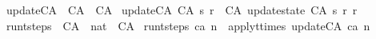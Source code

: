 \begin{isabellebody}
\isanewline
{}\isamarkupfalse%
\ update{\isacharunderscore}CA\ {\isacharcolon}{\isacharcolon}\ {\isachardoublequoteopen}CA\ {\isasymRightarrow}\ CA{\isachardoublequoteclose}\ \isanewline
{\isachardoublequoteopen}update{\isacharunderscore}CA\ {\isacharparenleft}CA\ s\ r{\isacharparenright}\ {\isacharequal}\ CA\ {\isacharparenleft}update{\isacharunderscore}state\ {\isacharparenleft}CA\ s\ r{\isacharparenright}{\isacharparenright}\ r{\isachardoublequoteclose}\isanewline
\isanewline
{}\isamarkupfalse%
\ run{\isacharunderscore}t{\isacharunderscore}steps\ {\isacharcolon}{\isacharcolon}\ {\isachardoublequoteopen}CA\ {\isasymRightarrow}\ nat\ {\isasymRightarrow}\ CA{\isachardoublequoteclose}\ \isanewline
{\isachardoublequoteopen}run{\isacharunderscore}t{\isacharunderscore}steps\ ca\ n\ {\isacharequal}\ apply{\isacharunderscore}t{\isacharunderscore}times\ update{\isacharunderscore}CA\ ca\ n{\isachardoublequoteclose}\isanewline
%
\isadelimtheory
%
\endisadelimtheory
%
\isatagtheory
{}\isamarkupfalse%
%
\endisatagtheory
{\isafoldtheory}%
%
\isadelimtheory
%
\endisadelimtheory
%
\end{isabellebody}%
\endinput
